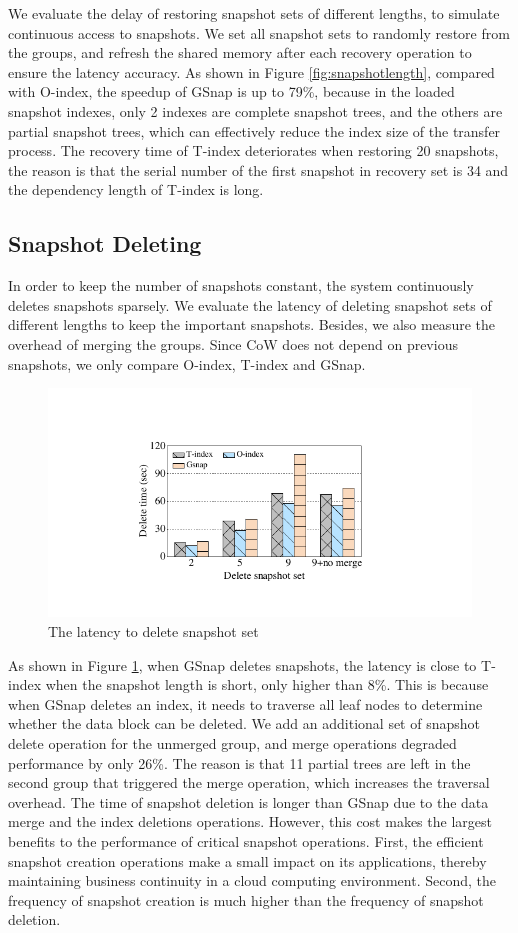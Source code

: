 \documentclass[sigconf, nonacm]{acmart}
\begin{document}
We evaluate the delay of restoring snapshot sets of different lengths, to simulate continuous access to snapshots. We set all snapshot sets to randomly restore from the groups, and refresh the shared memory after each recovery operation to ensure the latency accuracy.
As shown in Figure \ref{fig:snapshotlength}, compared with O-index, the speedup of GSnap is up to 79\%, because in the loaded snapshot indexes, only 2 indexes are complete snapshot trees, and the others are partial snapshot trees, which can effectively reduce the index size of the transfer process. 
The recovery time of T-index deteriorates when restoring 20 snapshots, the reason is that the serial number of the first snapshot in recovery set is 34 and the dependency length of T-index is long.


\subsection{Snapshot Deleting}
In order to keep the number of snapshots constant, the system continuously deletes snapshots sparsely. We evaluate the latency of deleting snapshot sets of different lengths to keep the important snapshots. Besides, we also measure the overhead of merging the groups.
Since CoW does not depend on previous snapshots, we only compare O-index, T-index and GSnap. 


\begin{figure}[htbp]
	\centering
	\includegraphics[width=0.8\columnwidth]{figures/ceph_pic/eval_delete.pdf}
	\caption{The latency to delete snapshot set}
	\label{fig:delete}
\end{figure}


As shown in Figure \ref{fig:delete}, when GSnap deletes snapshots, the latency is close to T-index when the snapshot length is short, only higher than 8\%. This is because when GSnap deletes an index, it needs to traverse all leaf nodes to determine whether the data block can be deleted. We add an additional set of snapshot delete operation for the unmerged group, and merge operations degraded performance by only 26\%. The reason is that 11 partial trees are left in the second group that triggered the merge operation, which increases the traversal overhead. The time of snapshot deletion is longer than GSnap due to the data merge and the index deletions operations. 
However, this cost makes the largest benefits to the performance of critical snapshot operations. 
First, the efficient snapshot creation operations make a small impact on its applications, thereby maintaining business continuity in a cloud computing environment. Second, the frequency of snapshot creation is much higher than the frequency of snapshot deletion.
\end{document}
